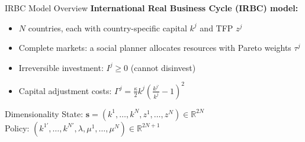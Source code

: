 \documentclass[aspectratio=169,11pt]{beamer}
\newcommand{\emphc}[1]{\textcolor{harvardcrimson}{#1}}
\newcommand{\R}{\mathbb{R}}
\begin{document}
\begin{frame}{IRBC Model Overview}
\textbf{International Real Business Cycle (IRBC) model:}

\vspace{0.5em}
\begin{itemize}
    \item $N$ countries, each with \emphc{country-specific capital} $k^j$ and \emphc{TFP} $z^j$
    \item \emphc{Complete markets}: a social planner allocates resources with Pareto weights $\tau^j$
    \item \emphc{Irreversible investment}: $I^j \geq 0$ (cannot disinvest)
    \item \emphc{Capital adjustment costs}: $\Gamma^j = \frac{\kappa}{2} k^j \!\left(\frac{k^{j\prime}}{k^j} - 1\right)^{\!2}$
\end{itemize}

\vspace{0.5em}
\begin{block}{Dimensionality}
State: $\bm{s} = (k^1, \ldots, k^N, z^1, \ldots, z^N) \in \R^{2N}$\\
Policy: $(k^{1\prime}, \ldots, k^{N\prime}, \lambda, \mu^1, \ldots, \mu^N) \in \R^{2N+1}$
\end{block}
\end{frame}
\end{document}
